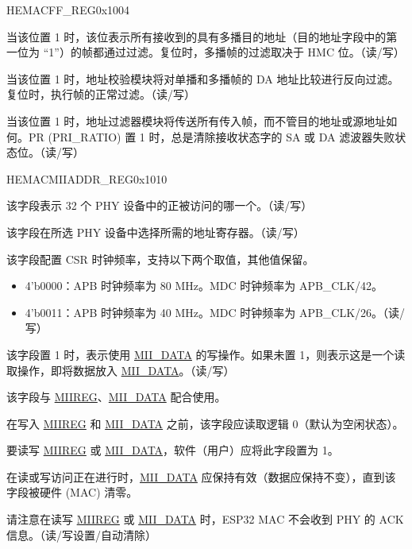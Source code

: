\begin{register}{H}{EMACFF\_REG}{0x1004}
\begin{regdesc}
\begin{reglist}
\item [PAM]当该位置 1 时，该位表示所有接收到的具有多播目的地址（目的地址字段中的第一位为 “1”）的帧都通过过滤。复位时，多播帧的过滤取决于 HMC 位。（读/写）
\item [DAIF]当该位置 1 时，地址校验模块将对单播和多播帧的 DA 地址比较进行反向过滤。复位时，执行帧的正常过滤。（读/写）
\item [PMODE]当该位置 1 时，地址过滤器模块将传送所有传入帧，而不管目的地址或源地址如何。PR (PRI\_RATIO) 置 1 时，总是清除接收状态字的 SA 或 DA 滤波器失败状态位。（读/写）
\end{reglist}\end{regdesc}
\end{register}

\begin{register}{H}{EMACMIIADDR\_REG}{0x1010}\label{regdesc:EMACMIIADDRREG}
%
%
%
%
%
%
\regnewline%
\begin{regdesc}\begin{reglist}
\item [MIIDEV]该字段表示 32 个 PHY 设备中的正被访问的哪一个。（读/写）
\item [MIIREG]\label{fielddesc:MIIREG} 该字段在所选 PHY 设备中选择所需的地址寄存器。（读/写）
\item  [MIICSRCLK]\label{fielddesc:MIICSRCLK} 该字段配置 CSR 时钟频率，支持以下两个取值，其他值保留。
\begin{itemize}
\item 4'b0000：APB 时钟频率为 80 MHz。MDC 时钟频率为 APB\_CLK/42。
\item 4'b0011：APB 时钟频率为 40 MHz。MDC 时钟频率为 APB\_CLK/26。（读/写）
\end{itemize}
\item [MIIWRITE] 该字段置 1 时，表示使用 \hyperref[regdesc:EMACMIIDATAREG]{MII\_DATA} 的写操作。如果未置 1，则表示这是一个读取操作，即将数据放入 \hyperref[regdesc:EMACMIIDATAREG]{MII\_DATA}。（读/写）
\item [MIIBUSY]\label{fielddesc:MIIBUSY} 该字段与 \hyperref[fielddesc:MIIREG]{MIIREG}、\hyperref[regdesc:EMACMIIDATAREG]{MII\_DATA} 配合使用。

在写入 \hyperref[fielddesc:MIIREG]{MIIREG} 和 \hyperref[regdesc:EMACMIIDATAREG]{MII\_DATA} 之前，该字段应读取逻辑 0（默认为空闲状态）。

要读写 \hyperref[fielddesc:MIIREG]{MIIREG} 或 \hyperref[regdesc:EMACMIIDATAREG]{MII\_DATA}，软件（用户）应将此字段置为 1。

在读或写访问正在进行时，\hyperref[regdesc:EMACMIIDATAREG]{MII\_DATA} 应保持有效（数据应保持不变），直到该字段被硬件 (MAC) 清零。

请注意在读写 \hyperref[fielddesc:MIIREG]{MIIREG} 或 \hyperref[regdesc:EMACMIIDATAREG]{MII\_DATA} 时，ESP32 MAC 不会收到 PHY 的 ACK 信息。（读/写设置/自动清除）
\end{reglist}\end{regdesc}
\end{register}


